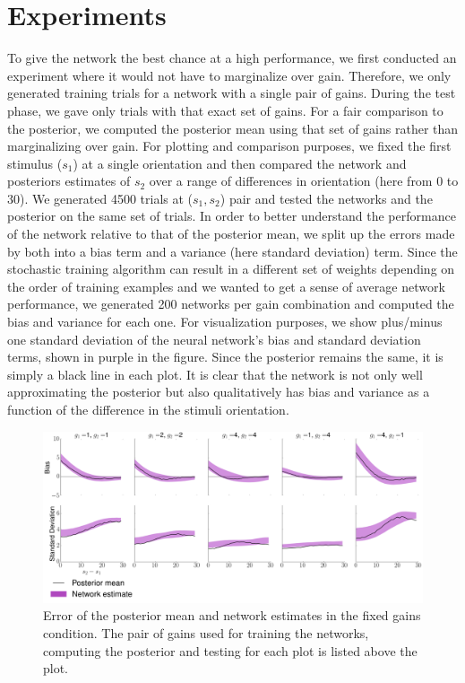 \documentclass{article} %
\begin{document}
\section{Experiments}
To give the network the best chance at a high performance, we first conducted an experiment where it would not have to marginalize over gain. Therefore, we only generated training trials for a network with a single pair of gains. During the test phase, we gave only trials with that exact set of gains. For a fair comparison to the posterior, we computed the posterior mean using that set of gains rather than marginalizing over gain. For plotting and comparison purposes, we fixed the first stimulus ($s_1$) at a single orientation and then compared the network and posteriors estimates of $s_2$ over a range of differences in orientation (here from 0 to 30). We generated 4500 trials at ($s_1, s_2$) pair and tested the networks and the posterior on the same set of trials. In order to better understand the performance of the network relative to that of the posterior mean, we split up the errors made by both into a bias term and a variance (here standard deviation) term. Since the stochastic training algorithm can result in a different set of weights depending on the order of training examples and we wanted to get a sense of average network performance, we generated 200 networks per gain combination and computed the bias and variance for each one. For visualization purposes, we show plus/minus one standard deviation of the neural network's bias and standard deviation terms, shown in purple in the figure. Since the posterior remains the same, it is simply a black line in each plot. It is clear that the network is not only well approximating the posterior but also qualitatively has bias and variance as a function of the difference in the stimuli orientation.
\begin{figure}[h]
\centering
\includegraphics[width = \textwidth]{Fixed_Gains.png}
\caption{Error of the posterior mean and network estimates in the fixed gains condition. The pair of gains used for training the networks, computing the posterior and testing for each plot is listed above the plot.}
\end{figure}
\end{document}
